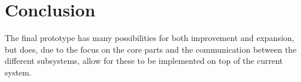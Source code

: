 
\chapter{Conclusion}


The final prototype has many possibilities for both improvement and expansion, but does, due to the focus on the core parts and the communication between the different subsystems, allow for these to be implemented on top of the current system.

\FloatBarrier